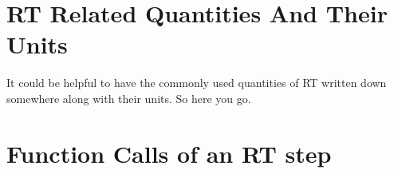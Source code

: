 \section{RT Related Quantities And Their Units}\label{app:variables}

It could be helpful to have the commonly used quantities of RT written down
somewhere along with their units. So here you go.










\clearpage
\section{Function Calls of an RT step}



